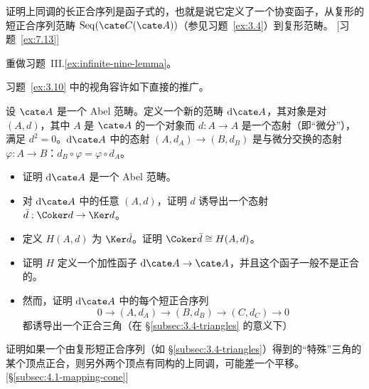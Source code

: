 \begin{prob}\label{ex:3.11}
证明上同调的长正合序列是函子式的，也就是说它定义了一个协变函子，从复形的短正合序列范畴 $\mathrm{Seq}(\cate C(\cate A))$（参见习题~\ref{ex:3.4}）到复形范畴。 [习题~\ref{ex:7.13}]
\end{prob}

\begin{prob}\label{ex:3.12}
重做习题~III.\ref{ex:infinite-nine-lemma}。
\end{prob}

\begin{prob}\label{ex:3.13}
习题~\ref{ex:3.10} 中的视角容许如下直接的推广。

设 $\cate A$ 是一个 Abel 范畴。定义一个新的范畴 $\mathrm{d}\cate A$，其对象是对 $(A,d)$，其中 $A$ 是 $\cate A$ 的一个对象而 $d:A\to A$ 是一个态射（即“微分”），满足 $d^2=0$。$\mathrm{d}\cate A$ 中的态射 $(A,d_A)\to (B,d_B)$ 是与微分交换的态射 $\varphi:A\to B$：$d_B\circ\varphi=\varphi\circ d_A$。
\begin{itemize}
\item 证明 $\mathrm{d}\cate A$ 是一个 Abel 范畴。
\item 对 $\mathrm{d}\cate A$ 中的任意 $(A,d)$，证明 $d$ 诱导出一个态射 $\bar d:\Coker d\to\Ker d$。
\item 定义 $H(A,d)$ 为 $\Ker\bar d$。证明 $\Coker\bar d\cong H(A,d)$。
\item 证明 $H$ 定义一个加性函子 $\mathrm{d}\cate A\to\cate A$，并且这个函子一般不是正合的。
\item 然而，证明 $\mathrm{d}\cate A$ 中的每个短正合序列
\[
0\longrightarrow (A,d_A)\longrightarrow (B,d_B)\longrightarrow (C,d_C)\longrightarrow 0
\]
都诱导出一个正合三角（在 \S\ref{subsec:3.4-triangles} 的意义下）
\begin{center}
\end{center}
\end{itemize}
\end{prob}

\begin{prob}\label{ex:3.14}
证明如果一个由复形短正合序列（如 \S\ref{subsec:3.4-triangles}）得到的“特殊”三角的某个顶点正合，则另外两个顶点有同构的上同调，可能差一个平移。 [\S\ref{subsec:4.1-mapping-cone}]
\end{prob}

